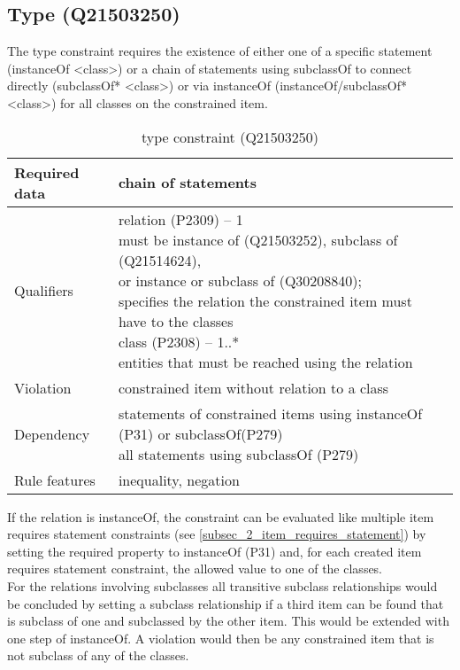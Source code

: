 \documentclass[hyperref,bachelorofscience,fleqn]{cgvpub}
\begin{document}
\subsection{Type (Q21503250)}\label{subsec_2_type}
The type constraint requires the existence of either one of a specific statement (instanceOf <class>) or a chain of statements using subclassOf to connect directly (subclassOf* <class>)
or via instanceOf (instanceOf/subclassOf* <class>) for all classes on the constrained item.
\begin{table}[H]
\caption{type constraint (Q21503250)}
\begin{tabularx}{\textwidth}{ ll X}
\hline
Required data & chain of statements \\
\hline
Qualifiers & \makecell{relation (P2309) -- 1 \\ must be instance of (Q21503252), subclass of (Q21514624), \\ or instance or subclass of (Q30208840); \\ specifies the relation the constrained item must have to the classes\\
class (P2308) -- 1..* \\ entities that must be reached using the relation} \\
\hline
Violation & constrained item without relation to a class \\
\hline
Dependency & \makecell{statements of constrained items using instanceOf (P31) or subclassOf(P279) \\ all statements using subclassOf (P279) }\\
\hline
Rule features & inequality, negation \\
\hline
\end{tabularx}
\end{table}

If the relation is instanceOf, the constraint can be evaluated like multiple item requires statement constraints (see \ref{subsec_2_item_requires_statement}) by setting the required property to instanceOf (P31) and, for each created item requires statement constraint, the allowed value to one of the classes. \\
For the relations involving subclasses all transitive subclass relationships would be concluded by setting a subclass relationship if a third item can be found that is subclass of one and subclassed by the other item. This would be extended with one step of instanceOf. A violation would then be any constrained item that is not subclass of any of the classes.
\end{document}
